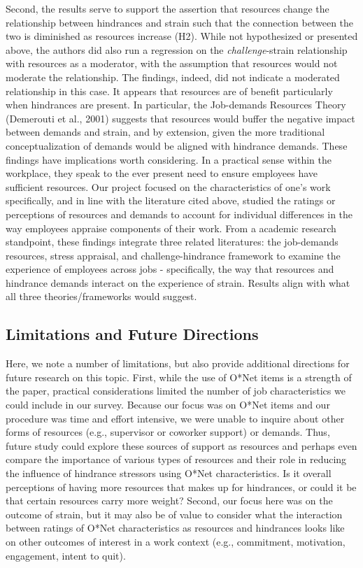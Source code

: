 \documentclass[
  english,
  man]{apa6}
\begin{document}
Second, the results serve to support the assertion that resources change the relationship between hindrances and strain such that the connection between the two is diminished as resources increase (H2). While not hypothesized or presented above, the authors did also run a regression on the \emph{challenge}-strain relationship with resources as a moderator, with the assumption that resources would not moderate the relationship. The findings, indeed, did not indicate a moderated relationship in this case. It appears that resources are of benefit particularly when hindrances are present. In particular, the Job-demands Resources Theory (Demerouti et al., 2001) suggests that resources would buffer the negative impact between demands and strain, and by extension, given the more traditional conceptualization of demands would be aligned with hindrance demands.
These findings have implications worth considering. In a practical sense within the workplace, they speak to the ever present need to ensure employees have sufficient resources. Our project focused on the characteristics of one's work specifically, and in line with the literature cited above, studied the ratings or perceptions of resources and demands to account for individual differences in the way employees appraise components of their work. From a academic research standpoint, these findings integrate three related literatures: the job-demands resources, stress appraisal, and challenge-hindrance framework to examine the experience of employees across jobs - specifically, the way that resources and hindrance demands interact on the experience of strain. Results align with what all three theories/frameworks would suggest.

\hypertarget{limitations-and-future-directions}{%
\subsection{Limitations and Future Directions}\label{limitations-and-future-directions}}

Here, we note a number of limitations, but also provide additional directions for future research on this topic. First, while the use of O*Net items is a strength of the paper, practical considerations limited the number of job characteristics we could include in our survey. Because our focus was on O*Net items and our procedure was time and effort intensive, we were unable to inquire about other forms of resources (e.g., supervisor or coworker support) or demands. Thus, future study could explore these sources of support as resources and perhaps even compare the importance of various types of resources and their role in reducing the influence of hindrance stressors using O*Net characteristics. Is it overall perceptions of having more resources that makes up for hindrances, or could it be that certain resources carry more weight? Second, our focus here was on the outcome of strain, but it may also be of value to consider what the interaction between ratings of O*Net characteristics as resources and hindrances looks like on other outcomes of interest in a work context (e.g., commitment, motivation, engagement, intent to quit).
\end{document}
